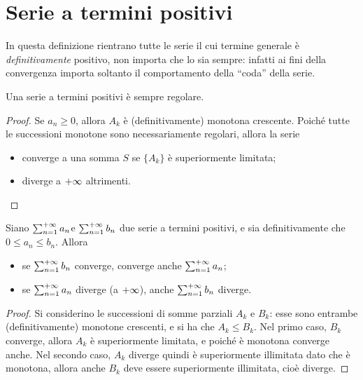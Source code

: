 \section{Serie a termini positivi}
In questa definizione rientrano tutte le serie il cui termine generale è \emph{definitivamente} positivo, non importa che lo sia sempre: infatti ai fini della convergenza importa soltanto il comportamento della ``coda'' della serie.
\begin{teorema}
Una serie a termini positivi è sempre regolare.
\end{teorema}
\begin{proof}
Se $a_n\geq 0$, allora $A_k$ è (definitivamente) monotona crescente. Poiché tutte le successioni monotone sono necessariamente regolari, allora la serie
\begin{itemize}
\item converge a una somma $S$ se $\{A_k\}$ è superiormente limitata;
\item diverge a $+\infty$ altrimenti.\qedhere
\end{itemize}
\end{proof}
\begin{teorema}
\label{t:confronto_serie}
Siano $\sum_{{n}=1}^{+\infty}a_n$e $\sum_{{n}=1}^{+\infty}b_n$ due serie a termini positivi, e sia definitivamente che $0\leq a_n\leq b_n$. Allora
\begin{itemize}
\item se $\sum_{{n}=1}^{+\infty}b_n$ converge, converge anche $\sum_{{n}=1}^{+\infty}a_n$;
\item se $\sum_{{n}=1}^{+\infty}a_n$ diverge (a $+\infty$), anche $\sum_{{n}=1}^{+\infty}b_n$ diverge.
\end{itemize}
\end{teorema}
\begin{proof}
Si considerino le successioni di somme parziali $A_k$ e $B_k$: esse sono entrambe (definitivamente) monotone crescenti, e si ha che $A_k\leq B_k$. Nel primo caso, $B_k$ converge, allora $A_k$ è superiormente limitata, e poiché è monotona converge anche.
Nel secondo caso, $A_k$ diverge quindi è superiormente illimitata dato che è monotona, allora anche $B_k$ deve essere superiormente illimitata, cioè diverge.
\end{proof}
